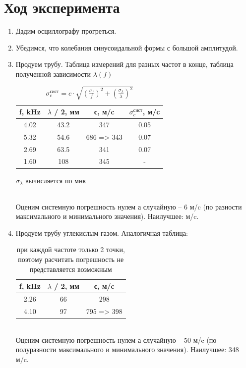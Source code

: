 \documentclass[11pt,a4paper]{article}
\begin{document}
\section*{Ход эксперимента}
\begin{enumerate}
  \item Дадим  осциллографу прогреться.
  \item Убедимся, что колебания синусоидальной формы с большой амплитудой.
  \item Продуем трубу. Таблица измерений для разных частот в конце, 
  таблица полученной зависимости $\lambda(f)$
  \begin{table}[h!]
    \begin{center}
    \begin{tabular}{|c|c|c|c|}
    \hline
    f, kHz & $\lambda$ / 2, мм & с, м/c & $\sigma_c^\text{сист}$, м/c\\ \hline
    4.02 & 43.2&  347              &  0.05\\ \hline
    5.32 & 54.6&  686 => 343       &  0.07\\ \hline
    2.69 & 63.5&  341              &  0.07\\ \hline
    1.60 & 108 &  345              &  -\\ \hline
    \end{tabular}
    \caption{$\sigma_c^\text{сист} = c \cdot \sqrt{
      (\frac{\sigma_f}{f})^2 + (\frac{\sigma_\lambda}{\lambda})^2}$}
    \end{center}
    $\sigma_\lambda$ вычисляется по мнк
\end{table}\\
Оценим системную погрешность нулем а случайную -- 6 м/c (по разности максимального и минимального значения).
Наилучшее:  м/c.
  \item Продуем трубу углекислым газом. Аналогичная таблица:
  \begin{table}[h!]
    \begin{center}
    \begin{tabular}{|c|c|c|}
    \hline
    f, kHz & $\lambda$ / 2, мм &  с, м/c     \\ \hline
    2.26   & 66                &  298        \\ \hline
    4.10   & 97                &  795 => 398 \\ \hline
    \end{tabular}
    \caption{при каждой частоте только 2 точки, поэтому расчитать погрешность не представляется возможным}
    \end{center}
  \end{table}\\
  Оценим системную погрешность нулем а случайную -- 50 м/c (по полуразности максимального и минимального значения).
Наилучшее: 348 м/c.


\end{enumerate}
\end{document}
